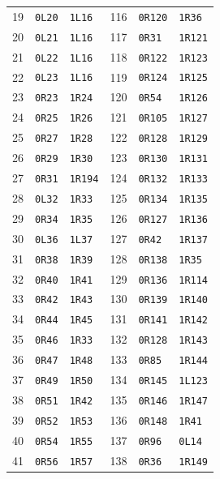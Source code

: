 \begin{longtable}{rllrll}
19 & \texttt{0L20} & \texttt{1L16} & 116 & \texttt{0R120} & \texttt{1R36} \\
20 & \texttt{0L21} & \texttt{1L16} & 117 & \texttt{0R31} & \texttt{1R121} \\
21 & \texttt{0L22} & \texttt{1L16} & 118 & \texttt{0R122} & \texttt{1R123} \\
22 & \texttt{0L23} & \texttt{1L16} & 119 & \texttt{0R124} & \texttt{1R125} \\
23 & \texttt{0R23} & \texttt{1R24} & 120 & \texttt{0R54} & \texttt{1R126} \\
24 & \texttt{0R25} & \texttt{1R26} & 121 & \texttt{0R105} & \texttt{1R127} \\
25 & \texttt{0R27} & \texttt{1R28} & 122 & \texttt{0R128} & \texttt{1R129} \\
26 & \texttt{0R29} & \texttt{1R30} & 123 & \texttt{0R130} & \texttt{1R131} \\
27 & \texttt{0R31} & \texttt{1R194} & 124 & \texttt{0R132} & \texttt{1R133} \\
28 & \texttt{0L32} & \texttt{1R33} & 125 & \texttt{0R134} & \texttt{1R135} \\
29 & \texttt{0R34} & \texttt{1R35} & 126 & \texttt{0R127} & \texttt{1R136} \\
30 & \texttt{0L36} & \texttt{1L37} & 127 & \texttt{0R42} & \texttt{1R137} \\
31 & \texttt{0R38} & \texttt{1R39} & 128 & \texttt{0R138} & \texttt{1R35} \\
32 & \texttt{0R40} & \texttt{1R41} & 129 & \texttt{0R136} & \texttt{1R114} \\
33 & \texttt{0R42} & \texttt{1R43} & 130 & \texttt{0R139} & \texttt{1R140} \\
34 & \texttt{0R44} & \texttt{1R45} & 131 & \texttt{0R141} & \texttt{1R142} \\
35 & \texttt{0R46} & \texttt{1R33} & 132 & \texttt{0R128} & \texttt{1R143} \\
36 & \texttt{0R47} & \texttt{1R48} & 133 & \texttt{0R85} & \texttt{1R144} \\
37 & \texttt{0R49} & \texttt{1R50} & 134 & \texttt{0R145} & \texttt{1L123} \\
38 & \texttt{0R51} & \texttt{1R42} & 135 & \texttt{0R146} & \texttt{1R147} \\
39 & \texttt{0R52} & \texttt{1R53} & 136 & \texttt{0R148} & \texttt{1R41} \\
40 & \texttt{0R54} & \texttt{1R55} & 137 & \texttt{0R96} & \texttt{0L14} \\
41 & \texttt{0R56} & \texttt{1R57} & 138 & \texttt{0R36} & \texttt{1R149} \\

\end{longtable}
